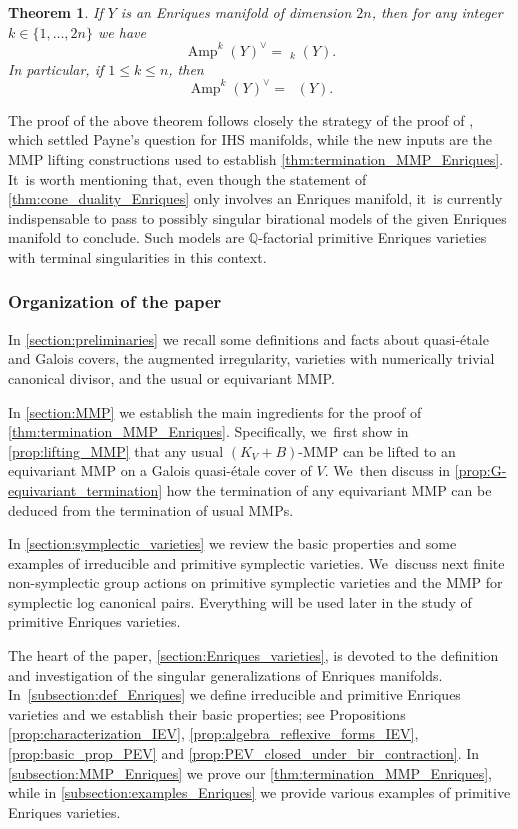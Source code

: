 \documentclass[10pt]{amsart}
\theoremstyle{plain}
\newtheorem{thm}{Theorem}[section]
\theoremstyle{definition}
\newcommand{\Q}{\mathbb{Q}}
\DeclareMathOperator{\Amp}{\mathrm{Amp}}
\DeclareMathOperator{\NEb}{\overline{\mathrm{NE}}}
\DeclareMathOperator{\bMobc}{\overline{\mathrm{bMob}}}
\begin{document}
\begin{thm}
\label{thm:cone_duality_Enriques}
If $Y$ is an Enriques manifold of dimension $2n$, then for any integer
$k \in \{ 1, \dots, 2n \}$
we have
\[
\Amp^k(Y)^{\vee} = \bMobc_k(Y).
\]
In particular, if $1 \leq k \leq n$, then
\[
\Amp^k(Y)^{\vee} = \NEb(Y).
\]
\end{thm}

The proof of the above theorem follows closely the strategy of the proof of \cite[Th.\,B]{DRO25}, which settled Payne's question for IHS manifolds, while the new inputs are the MMP lifting constructions used to establish \autoref{thm:termination_MMP_Enriques}. It~is worth mentioning that, even though the statement of \autoref{thm:cone_duality_Enriques} only involves an Enriques manifold, it~is currently indispensable to pass to possibly singular birational models of the given Enriques manifold to conclude. Such models are $\Q$\nobreakdash-factorial primitive Enriques varieties with terminal singularities in this context.

\subsubsection*{Organization of the paper}
In \autoref{section:preliminaries} we recall some definitions and facts about quasi-étale and Galois covers, the augmented irregularity, varieties with numerically trivial canonical divisor, and the usual or equivariant MMP.

In \autoref{section:MMP} we establish the main ingredients for the proof of \autoref{thm:termination_MMP_Enriques}. Specifically, we~first show in \autoref{prop:lifting_MMP} that any usual $(K_V + B)$-MMP can be lifted to an equivariant MMP on a Galois quasi-étale cover of $V$. We~then discuss in \autoref{prop:G-equivariant_termination} how the termination of any equivariant MMP can be deduced from the termination of usual MMPs.

In \autoref{section:symplectic_varieties} we review the basic properties and some examples of irreducible and primitive symplectic varieties. We~discuss next finite non-symplectic group actions on primitive symplectic varieties and the MMP for symplectic log canonical pairs. Everything will be used later in the study of primitive Enriques varieties.

The heart of the paper, \autoref{section:Enriques_varieties}, is devoted to the definition and investigation of the singular generalizations of Enriques manifolds. In~\autoref{subsection:def_Enriques} we define irreducible and primitive Enriques varieties and we establish their basic properties; see Propositions \ref{prop:characterization_IEV}, \ref{prop:algebra_reflexive_forms_IEV}, \ref{prop:basic_prop_PEV} and \ref{prop:PEV_closed_under_bir_contraction}.
In \autoref{subsection:MMP_Enriques} we prove our \autoref{thm:termination_MMP_Enriques}, while in \autoref{subsection:examples_Enriques} we provide various examples of primitive Enriques varieties.
\end{document}

